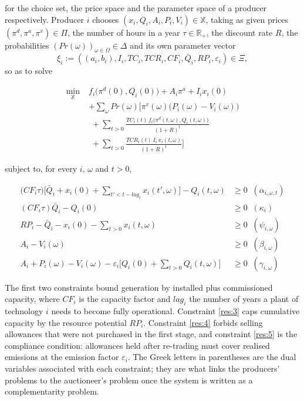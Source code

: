 \documentclass[a4paper,fleqn]{cas-dc}
\begin{document}
for the choice set, the price space and the parameter space of a producer respectively. Producer $i$ chooses $(x_i,Q_i,A_i,P_i,V_i)\in\mathbb{X}$, taking as given prices $(\pi^d,\pi^a,\pi^v)\in\Pi$, the number of hours in a year $\tau\in\mathbb{R}_+$, the discount rate $R$, the probabilities $(Pr(\omega))_{\omega\in\Omega}\in\Delta$ and its own parameter vector
\[
\xi_i:=\left((a_i,b_i),I_i,TC_i,TCR_i,CF_i,\bar Q_i,RP_i,\varepsilon_i\right)\in\Xi ,
\]
so as to solve

\begin{equation}\label{eq:prodobj}
\begin{split}
\min_{\mathbb{X}} \; & f_i\big(\pi^d(0),Q_i(0)\big)+A_i\pi^a+I_i x_i(0) \\
 & + \sum_{\omega} Pr(\omega)\bigg[\pi^v(\omega)\big(P_i(\omega)-V_i(\omega)\big) \\
 & \; + \sum_{t>0}\frac{TC_i(t)\, f_i\big(\pi^d(t,\omega),Q_i(t,\omega)\big)}{(1+R)^t} \\
 & \; + \sum_{t>0}\frac{TCR_i(t)\, I_i\, x_i(t,\omega)}{(1+R)^t}\bigg]
\end{split}
\end{equation}

subject to, for every $i$, $\omega$ and $t>0$,

\begin{footnotesize}
\begin{align}
\big(CF_i\tau\big)\bigg[\bar Q_i+x_i(0)+\!\!\sum_{t'<t-lag_i}\!\!x_i(t',\omega)\bigg]-Q_i(t,\omega) &\geq 0 \;\; (\alpha_{i,\omega,t}) \label{res:capt}\\
(CF_i\tau)\bar Q_i-Q_i(0) &\geq 0 \;\; (\kappa_i) \label{res:2}\\
RP_i-\bar Q_i-x_i(0)-\sum_{t>0}x_i(t,\omega) &\geq 0 \;\; (\psi_{i,\omega}) \label{res:3}\\
A_i-V_i(\omega) &\geq 0 \;\; (\beta_{i,\omega}) \label{res:4}\\
A_i+P_i(\omega)-V_i(\omega)-\varepsilon_i\bigg[Q_i(0)+\!\sum_{t>0}\!Q_i(t,\omega)\bigg] &\geq 0 \;\; (\gamma_{i,\omega}) \label{res:5}
\end{align}
\end{footnotesize}

The first two constraints bound generation by installed plus commissioned capacity, where $CF_i$ is the capacity factor and $lag_i$ the number of years a plant of technology $i$ needs to become fully operational. Constraint \eqref{res:3} caps cumulative capacity by the resource potential $RP_i$. Constraint \eqref{res:4} forbids selling allowances that were not purchased in the first stage, and constraint \eqref{res:5} is the compliance condition: allowances held after re-trading must cover realised emissions at the emission factor $\varepsilon_i$. The Greek letters in parentheses are the dual variables associated with each constraint; they are what links the producers' problems to the auctioneer's problem once the system is written as a complementarity problem.
\end{document}
